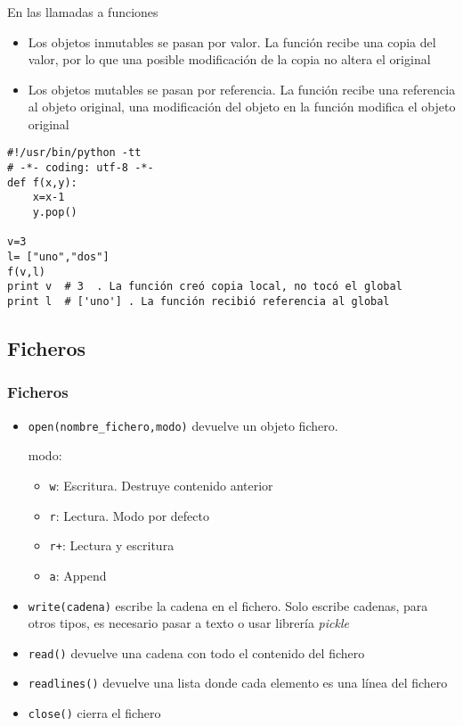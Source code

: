 \documentclass[ucs]{beamer}
\begin{document}
\begin{frame}[fragile]
\frametitle{}
En las llamadas a funciones
\begin{itemize}
\item
Los objetos inmutables se pasan por valor. La función recibe una
copia del valor, por lo que una posible modificación de la copia no
altera el original
\item
Los objetos mutables se pasan por referencia. La función recibe una
referencia al objeto original, una modificación del objeto en la función
modifica el objeto original
\end{itemize}


  \begin{footnotesize}
  \begin{verbatim}
#!/usr/bin/python -tt
# -*- coding: utf-8 -*-
def f(x,y):
    x=x-1
    y.pop()   

v=3
l= ["uno","dos"]
f(v,l)
print v  # 3  . La función creó copia local, no tocó el global
print l  # ['uno'] . La función recibió referencia al global
  \end{verbatim}
  \end{footnotesize}

\end{frame}


\subsection{Ficheros}

\begin{frame}[fragile]
\frametitle{Ficheros}
\begin{itemize}
  
\item \verb|open(nombre_fichero,modo)| devuelve un objeto fichero.

modo:
\begin{itemize}
  
\item \verb|w|: Escritura. Destruye contenido anterior
\item \verb|r|: Lectura. Modo por defecto
\item \verb|r+|: Lectura y escritura
\item \verb|a|: Append

\end{itemize}

\item \verb|write(cadena)| escribe la cadena en el fichero. Solo escribe cadenas,
para otros tipos, es necesario pasar a texto o usar librería \emph{pickle} 
\item \verb|read()| devuelve una cadena con todo el contenido del fichero
\item \verb|readlines()| devuelve una lista donde cada elemento es una línea del fichero
\item \verb|close()| cierra el fichero

\end{itemize}
\end{frame}
\end{document}
